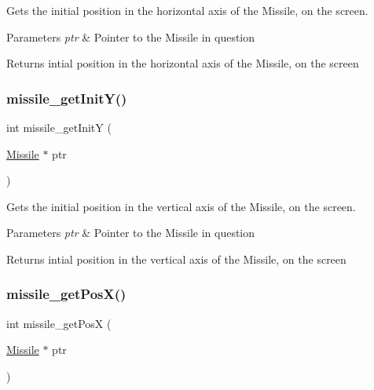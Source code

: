 Gets the initial position in the horizontal axis of the Missile, on the screen. 


\begin{DoxyParams}{Parameters}
{\em ptr} & Pointer to the Missile in question\\
\hline
\end{DoxyParams}
\begin{DoxyReturn}{Returns}
intial position in the horizontal axis of the Missile, on the screen 
\end{DoxyReturn}
\hypertarget{group___missile_ga6083be12aadde673a28d0a391391f96e}{}\label{group___missile_ga6083be12aadde673a28d0a391391f96e} 
\subsubsection{\texorpdfstring{missile\+\_\+get\+Init\+Y()}{missile\_getInitY()}}
{\footnotesize\ttfamily int missile\+\_\+get\+InitY (\begin{DoxyParamCaption}\item[{\hyperlink{group___missile_ga7ea98f7c879356e5dfa41934529d86e1}{Missile} $\ast$}]{ptr }\end{DoxyParamCaption})}



Gets the initial position in the vertical axis of the Missile, on the screen. 


\begin{DoxyParams}{Parameters}
{\em ptr} & Pointer to the Missile in question\\
\hline
\end{DoxyParams}
\begin{DoxyReturn}{Returns}
intial position in the vertical axis of the Missile, on the screen 
\end{DoxyReturn}
\hypertarget{group___missile_gabfb8e910eca430d5538a6d5b3ec8cb6e}{}\label{group___missile_gabfb8e910eca430d5538a6d5b3ec8cb6e} 
\subsubsection{\texorpdfstring{missile\+\_\+get\+Pos\+X()}{missile\_getPosX()}}
{\footnotesize\ttfamily int missile\+\_\+get\+PosX (\begin{DoxyParamCaption}\item[{\hyperlink{group___missile_ga7ea98f7c879356e5dfa41934529d86e1}{Missile} $\ast$}]{ptr }\end{DoxyParamCaption})}



